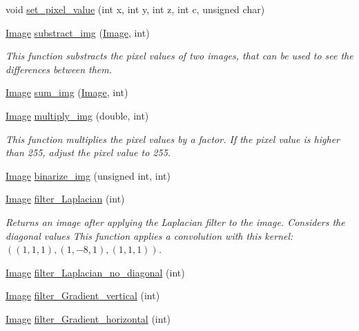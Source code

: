\begin{DoxyCompactItemize}
\item 
void \hyperlink{class_image_a4800a984610ffce53488c13d223a5b38}{set\-\_\-pixel\-\_\-value} (int x, int y, int z, int c, unsigned char)
\item 
\hyperlink{class_image}{Image} \hyperlink{class_image_ae503021a1c7b4188a457d55d7571e63d}{substract\-\_\-img} (\hyperlink{class_image}{Image}, int)
\begin{DoxyCompactList}\small\item\em This function substracts the pixel values of two images, that can be used to see the differences between them. \end{DoxyCompactList}\item 
\hyperlink{class_image}{Image} \hyperlink{class_image_a652abac4bfdd2fcff0cdb5627ac8ad49}{sum\-\_\-img} (\hyperlink{class_image}{Image}, int)
\item 
\hyperlink{class_image}{Image} \hyperlink{class_image_ae546904988636a989dfca3950030bd85}{multiply\-\_\-img} (double, int)
\begin{DoxyCompactList}\small\item\em This function multiplies the pixel values by a factor. If the pixel value is higher than 255, adjust the pixel value to 255. \end{DoxyCompactList}\item 
\hyperlink{class_image}{Image} \hyperlink{class_image_ac23d8c133700c751fac7ce6615641fde}{binarize\-\_\-img} (unsigned int, int)
\item 
\hyperlink{class_image}{Image} \hyperlink{class_image_abda67bfc036d9de98bf806c93fbae370}{filter\-\_\-\-Laplacian} (int)
\begin{DoxyCompactList}\small\item\em Returns an image after applying the Laplacian filter to the image. Considers the diagonal values This function applies a convolution with this kernel\-: $ ((1, 1, 1), (1, -8, 1), (1, 1, 1)) $. \end{DoxyCompactList}\item 
\hyperlink{class_image}{Image} \hyperlink{class_image_a308423cd4b7291228c4dcd1a9a4f8856}{filter\-\_\-\-Laplacian\-\_\-no\-\_\-diagonal} (int)
\item 
\hyperlink{class_image}{Image} \hyperlink{class_image_a66ea21718b13184a2d49d52a49cda750}{filter\-\_\-\-Gradient\-\_\-vertical} (int)
\item 
\hyperlink{class_image}{Image} \hyperlink{class_image_aeff1dd9c6747100583ecd976a298e67b}{filter\-\_\-\-Gradient\-\_\-horizontal} (int)
\item 

\end{DoxyCompactItemize}
